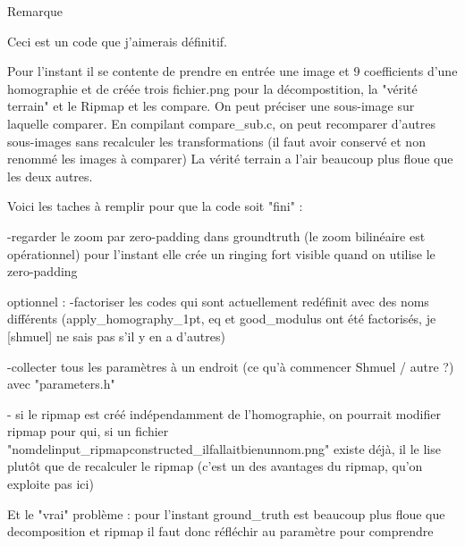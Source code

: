 Remarque

Ceci est un code que j’aimerais définitif.

Pour l'instant il se contente de prendre en entrée une image et 9 coefficients d'une homographie et de créée trois fichier.png pour la décompostition, la "vérité terrain" et le Ripmap et les compare. On peut préciser une sous-image sur laquelle comparer.
En compilant compare_sub.c, on peut recomparer d'autres sous-images sans recalculer les transformations (il faut avoir conservé et non renommé les images à comparer)
La vérité terrain a l'air beaucoup plus floue que les deux autres.



Voici les taches à remplir pour que la code soit "fini" :

	-regarder le zoom par zero-padding dans groundtruth (le zoom bilinéaire est opérationnel)
		pour l'instant elle crée un ringing fort visible quand on utilise le zero-padding
	
	
	
optionnel :
	-factoriser les codes qui sont actuellement redéfinit avec des noms différents (apply_homography_1pt, eq et good_modulus ont été factorisés, je [shmuel] ne sais pas s'il y en a d'autres) 
	
	-collecter tous les paramètres à un endroit (ce qu'à commencer Shmuel / autre ?) avec "parameters.h"
	
	- si le ripmap est créé indépendamment de l'homographie, on pourrait modifier ripmap pour qui, si un fichier "nomdelinput_ripmapconstructed_ilfallaitbienunnom.png" existe déjà, il le lise plutôt que de recalculer le ripmap (c'est un des avantages du ripmap, qu'on exploite pas ici)
	
	
	
Et le "vrai" problème :
	pour l'instant ground_truth est beaucoup plus floue que decomposition et ripmap
	il faut donc réfléchir au paramètre pour comprendre
